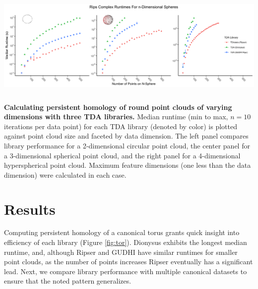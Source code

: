\begin{widefigure}[bt]
  \centering
  \includegraphics[height=2in]{fig4.png}
  \caption{
    \textbf{Calculating persistent homology of round point clouds of varying dimensions with three TDA libraries.}
    Median runtime (min to max, $n=10$ iterations per data point) for each TDA library (denoted by color) is plotted against point cloud size and faceted by data dimension.
    The left panel compares library performance for a 2-dimensional circular point cloud, the center panel for a 3-dimensional spherical point cloud, and the right panel for a 4-dimensional hyperspherical point cloud.
    Maximum feature dimensions (one less than the data dimension) were calculated in each case.
  }
\label{fig:cir}
\end{widefigure}

\hypertarget{results}{%
\section{Results}\label{results}}

Computing persistent homology of a canonical torus grants quick insight
into efficiency of each library (Figure \ref{fig:tor}). Dionysus
exhibits the longest median runtime, and, although Ripser and GUDHI have
similar runtimes for smaller point clouds, as the number of points
increases Ripser eventually has a significant lead. Next, we compare
library performance with multiple canonical datasets to ensure that the
noted pattern generalizes.

